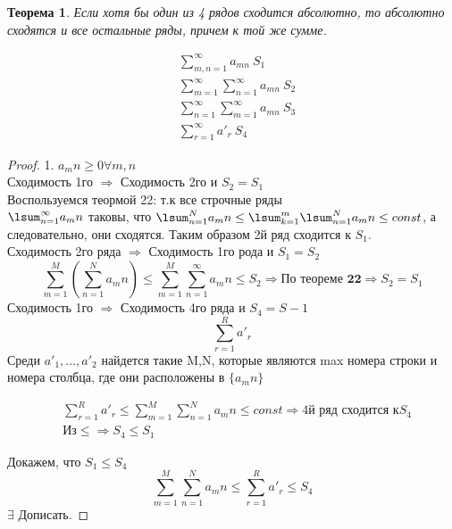 \documentclass[12pt, oneside]{article}
\theoremstyle{plain}
\newtheorem{Theorem}{Теорема}
\begin{document}
	\begin{Theorem}
		Если хотя бы один из 4 рядов сходится абсолютно, то абсолютно сходятся и все 
		остальные ряды, причем к той же сумме.
	
	\begin{equation}
	\begin{split} \nonumber
		& \sum_{m,n=1}^{\infty} a_{mn} ~ S_1 \\
		& \sum_{m = 1}^{\infty}\sum_{n=1}^{\infty} a_{mn} ~ S_2 \\
		& \sum_{n = 1}^{\infty}\sum_{m=1}^{\infty} a_{mn} ~ S_3 \\
		& \sum_{r=1}^{\infty} a'_r ~ S_4
	\end{split}
	\end{equation}
	\end{Theorem}

	\begin{proof}
		1. \(a_mn \geq 0 \forall m, n\) \\
		Сходимость 1го \(\Rightarrow\) Сходимость 2го и \(S_2 = S_1\) \\
		Воспользуемся теормой 22: т.к все строчные ряды\\
		\(\lsum_{n=1}^{\infty} a_mn\) таковы, что \(\lsum_{n=1}^{N} a_mn \leq 
		\lsum_{k=1}^{m}\lsum_{n=1}^{N}a_mn \leq const\), а следовательно, они 
		сходятся. Таким образом 2й ряд сходится к \(S_1\).\\
		Сходимость 2го ряда \(\Rightarrow\) Сходимость 1го рода и \(S_1 = S_2\)
		\begin{equation} \nonumber
			\sum_{m=1}^{M}\left(\sum_{n=1}^{N} a_mn\right) \leq
			\sum_{m=1}^{M}\sum_{n=1}^{\infty} a_mn \leq S_2
			\Rightarrow \textbf{По теореме 22} \Rightarrow S_2 = S_1
		\end{equation}
		Сходимость 1го \(\Rightarrow\) Сходимость 4го ряда и \(S_4 = S-1\)
		\begin{equation} \nonumber
			\sum_{r=1}^{R} a'_r
		\end{equation}
		Среди \(a'_1, ..., a'_2\) найдется такие M,N, которые являются max номера 
		строки и номера столбца, где они расположены в \(\{a_mn\}\)

		\begin{equation} \nonumber
		\begin{split}
			& \sum_{r=1}^{R} a'_r \leq \sum_{m=1}^{M}\sum_{n=1}^{N} a_mn \leq const
			\Rightarrow \text{4й ряд сходится к} S_4 \\
			& \text{Из} \leq \Rightarrow S_4 \leq S_1
		\end{split}
		\end{equation}

		Докажем, что \(S_1 \leq S_4\)
		\begin{equation}\nonumber
			\sum_{m=1}^{M}\sum_{n=1}^{N} a_mn \leq \sum_{r=1}^{R} a'_r \leq S_4
		\end{equation}
		\(\exists\)
		Дописать.
	\end{proof}
\end{document}
